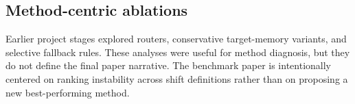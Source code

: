 

\subsection{Method-centric ablations}

Earlier project stages explored routers, conservative target-memory variants, and selective fallback rules. These analyses were useful for method diagnosis, but they do not define the final paper narrative. The benchmark paper is intentionally centered on ranking instability across shift definitions rather than on proposing a new best-performing method.
